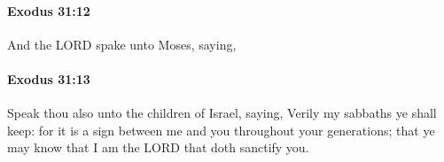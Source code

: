 		\paragraph{Exodus 31:12} %
			\label{EXODUS-31-12}

			And the LORD spake unto Moses, saying,


		\paragraph{Exodus 31:13} %
			\label{EXODUS-31-13}

			Speak thou also unto the children of Israel, saying, Verily my sabbaths ye shall keep: for it is a sign between me and you throughout your generations; that ye may know that I am the LORD that doth sanctify you.


